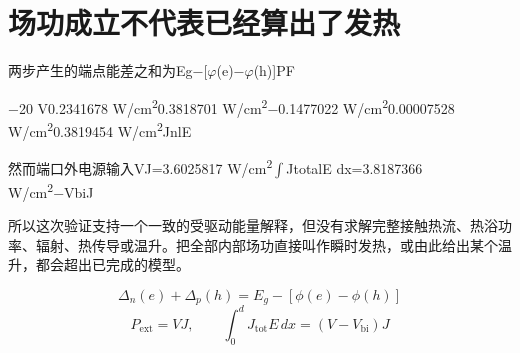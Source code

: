 \documentclass[11pt,a4paper]{article}
\begin{document}
\section{{\cjkfont 场功成立不代表已经算出了发热}\allowbreak{}}\label{sec:25}
{\cjkfont 两步产生的端点能差之和为}\allowbreak{}Eg−[\ensuremath{\varphi}(e)−\ensuremath{\varphi}(h)]\allowbreak{}PF\allowbreak{}
\par
−20 V\allowbreak{}0.2341678 W/cm\textsuperscript{2}\allowbreak{}0.3818701 W/cm\textsuperscript{2}\allowbreak{}−0.1477022 W/cm\textsuperscript{2}\allowbreak{}0.00007528 W/cm\textsuperscript{2}\allowbreak{}0.3819454 W/cm\textsuperscript{2}\allowbreak{}JnlE\allowbreak{}
\par
{\cjkfont 然而端口外电源输入}\allowbreak{}VJ=\allowbreak{}3.6025817 W/cm\textsuperscript{2}\allowbreak{}\ensuremath{\int}JtotalE dx=\allowbreak{}3.8187366 W/cm\textsuperscript{2}\allowbreak{}−VbiJ\allowbreak{}
\par
{\cjkfont 所以这次验证支持一个一致的受驱动能量解释，但没有求解完整接触热流、热浴功率、辐射、热传导或温升。把全部内部场功直接叫作瞬时发热，或由此给出某个温升，都会超出已完成的模型。}\allowbreak{}
\par
\begin{equation}
\Delta_n(e)+\Delta_p(h)=E_g-[\phi(e)-\phi(h)]
\label{eq:27}\end{equation}
\begin{equation}
P_{\mathrm{ext}}=VJ,\qquad\int_0^d J_{\mathrm{tot}}E\,dx=(V-V_{\mathrm{bi}})J
\label{eq:28}\end{equation}
\end{document}
